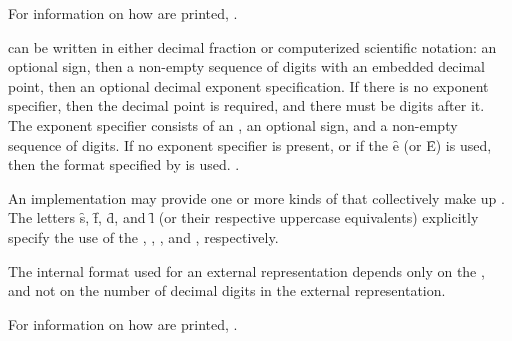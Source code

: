 For information on how  are printed,
\seesection\PrintingRatios.

\endsubsubsubsection%

\endsubsubsection%


 can be written in either decimal fraction or computerized
scientific notation: an optional sign, then a non-empty sequence of digits
with an embedded decimal point,
then an optional decimal exponent specification.
If there is no exponent specifier, then
the decimal point is required, and there must be digits
after it.
The exponent specifier consists of an ,
an optional sign, and a non-empty sequence of digits.
If no exponent specifier is present, or if the  \f{e}
(or \f{E}) is used, then
the format specified
by  is used.
\Seefigure\SyntaxForNumericTokens.

An implementation may provide one or more kinds of 
that collectively make up .
The letters \f{s}, \f{f}, \f{d}, and \f{l} (or their
respective uppercase equivalents) explicitly specify the
use of the  , , 
, and , respectively.
                                                
The internal format used for an external representation depends only
on the , and not on the number of decimal digits
in the external representation.

For information on how  are printed,
\seesection\PrintingFloats.

\endsubsubsection%



